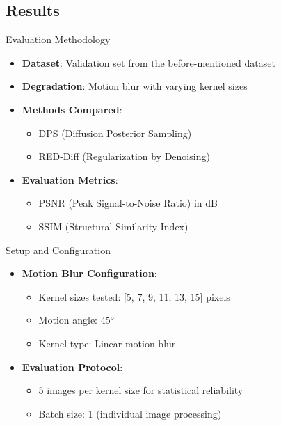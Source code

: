 \subsection{Results}

\begin{frame}{Evaluation Methodology}
    \begin{itemize}
        \item \textbf{Dataset}: Validation set from the before-mentioned dataset
        \item \textbf{Degradation}: Motion blur with varying kernel sizes
        \item \textbf{Methods Compared}:
              \begin{itemize}
                  \item DPS (Diffusion Posterior Sampling)
                  \item RED-Diff (Regularization by Denoising)
              \end{itemize}
        \item \textbf{Evaluation Metrics}:
              \begin{itemize}
                  \item PSNR (Peak Signal-to-Noise Ratio) in dB
                  \item SSIM (Structural Similarity Index)
              \end{itemize}
    \end{itemize}
\end{frame}

\begin{frame}{Setup and Configuration}
    \begin{itemize}
        \item \textbf{Motion Blur Configuration}:
              \begin{itemize}
                  \item Kernel sizes tested: [5, 7, 9, 11, 13, 15] pixels
                  \item Motion angle: 45°
                  \item Kernel type: Linear motion blur
              \end{itemize}
        \item \textbf{Evaluation Protocol}:
              \begin{itemize}
                  \item 5 images per kernel size for statistical reliability
                  \item Batch size: 1 (individual image processing)
              \end{itemize}
    \end{itemize}
\end{frame}

